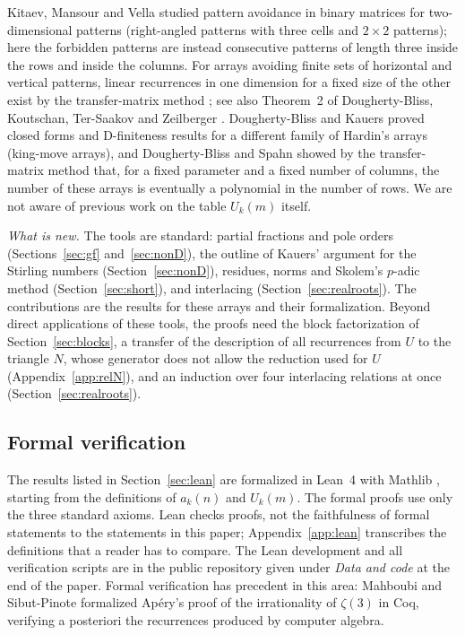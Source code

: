 \documentclass[11pt]{amsart}
\theoremstyle{definition}
\begin{document}
Kitaev, Mansour and Vella \cite{KMV} studied pattern avoidance in binary matrices for two-dimensional patterns (right-angled patterns with three cells and $2\times2$ patterns); here the forbidden patterns are instead consecutive patterns of length three inside the rows and inside the columns. For arrays avoiding finite sets of horizontal and vertical patterns, linear recurrences in one dimension for a fixed size of the other exist by the transfer-matrix method \cite[Section~4.7]{StanleyEC1}; see also Theorem~2 of Dougherty-Bliss, Koutschan, Ter-Saakov and Zeilberger \cite{DBKTZ}. Dougherty-Bliss and Kauers \cite{DBK} proved closed forms and D-finiteness results for a different family of Hardin's arrays (king-move arrays), and Dougherty-Bliss and Spahn \cite{DBS} showed by the transfer-matrix method that, for a fixed parameter and a fixed number of columns, the number of these arrays is eventually a polynomial in the number of rows. We are not aware of previous work on the table $U_k(m)$ itself.

\emph{What is new.} The tools are standard: partial fractions and pole orders (Sections~\ref{sec:gf} and~\ref{sec:nonD}), the outline of Kauers' argument for the Stirling numbers (Section~\ref{sec:nonD}), residues, norms and Skolem's $p$-adic method (Section~\ref{sec:short}), and interlacing (Section~\ref{sec:realroots}). The contributions are the results for these arrays and their formalization. Beyond direct applications of these tools, the proofs need the block factorization of Section~\ref{sec:blocks}, a transfer of the description of all recurrences from $U$ to the triangle $N$, whose generator does not allow the reduction used for $U$ (Appendix~\ref{app:relN}), and an induction over four interlacing relations at once (Section~\ref{sec:realroots}).

\subsection{Formal verification}
The results listed in Section~\ref{sec:lean} are formalized in Lean~4 \cite{Lean4} with Mathlib \cite{Mathlib}, starting from the definitions of $a_k(n)$ and $U_k(m)$. The formal proofs use only the three standard axioms. Lean checks proofs, not the faithfulness of formal statements to the statements in this paper; Appendix~\ref{app:lean} transcribes the definitions that a reader has to compare. The Lean development and all verification scripts are in the public repository given under \emph{Data and code} at the end of the paper. Formal verification has precedent in this area: Mahboubi and Sibut-Pinote \cite{MSP21} formalized Ap\'ery's proof of the irrationality of $\zeta(3)$ in Coq, verifying a posteriori the recurrences produced by computer algebra.
\end{document}
